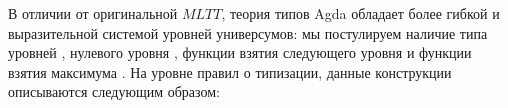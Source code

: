 \documentclass{article}[12pt]
\begin{document}
В отличии от оригинальной $MLTT$, теория типов Agda обладает более гибкой и выразительной системой
уровней универсумов: мы постулируем наличие типа уровней , 
нулевого уровня , функции взятия следующего уровня 
и функции взятия максимума . На уровне правил о типизации, данные конструкции
описываются следующим образом:
\begin{multicols}{2}
    \begin{prooftree}
    \end{prooftree}
    \begin{prooftree}
    \end{prooftree}
\end{multicols}
\begin{multicols}{2}
    \begin{prooftree}
    \end{prooftree}
    \begin{prooftree}
    \end{prooftree}
\end{multicols}
\begin{multicols}{2}
    \begin{prooftree}
    \end{prooftree}
    \begin{prooftree}
    \end{prooftree}
\end{multicols}
\begin{prooftree}
\end{prooftree}
\begin{prooftree}
\end{prooftree}
\begin{prooftree}
\end{prooftree}
\end{document}
